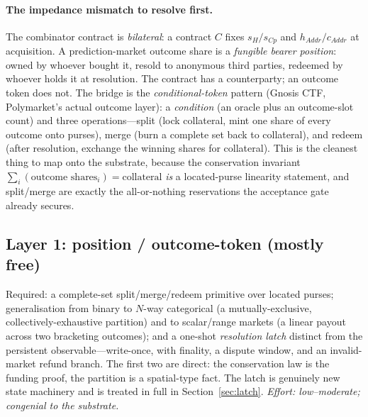 \documentclass[11pt]{article}
\begin{document}
\paragraph{The impedance mismatch to resolve first.} The combinator contract is
\emph{bilateral}: a contract $C$ fixes $s_H/s_{Cp}$ and $h_{\mathit{Addr}}/c_{\mathit{Addr}}$
at acquisition. A prediction-market outcome share is a \emph{fungible bearer position}: owned
by whoever bought it, resold to anonymous third parties, redeemed by whoever holds it at
resolution. The contract has a counterparty; an outcome token does not. The bridge is the
\emph{conditional-token} pattern (Gnosis CTF, Polymarket's actual outcome layer): a
\emph{condition} (an oracle plus an outcome-slot count) and three operations---\textsf{split}
(lock collateral, mint one share of every outcome onto purses), \textsf{merge} (burn a
complete set back to collateral), and \textsf{redeem} (after resolution, exchange the winning
shares for collateral). This is the cleanest thing to map onto the substrate, because the
conservation invariant $\sum_i (\text{outcome shares}_i) = \text{collateral}$ \emph{is} a
located-purse linearity statement, and \textsf{split}/\textsf{merge} are exactly the
all-or-nothing reservations the acceptance gate already secures.

\subsection*{Layer 1: position / outcome-token (mostly free)}
Required: a complete-set \textsf{split}/\textsf{merge}/\textsf{redeem} primitive over located
purses; generalisation from binary to $N$-way categorical (a mutually-exclusive,
collectively-exhaustive partition) and to scalar/range markets (a linear payout across two
bracketing outcomes); and a one-shot \emph{resolution latch} distinct from the persistent
observable---write-once, with finality, a dispute window, and an invalid-market refund
branch. The first two are direct: the conservation law is the funding proof, the partition is
a spatial-type fact. The latch is genuinely new state machinery and is treated in full in
Section~\ref{sec:latch}. \emph{Effort: low--moderate; congenial to the substrate.}
\end{document}
